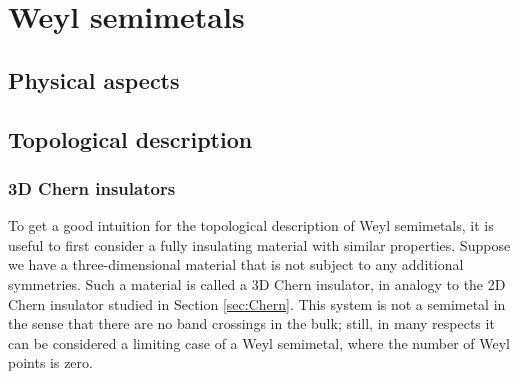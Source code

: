 \chapter{Weyl semimetals}\label{chap:WSM}

\section{Physical aspects}


\section{Topological description}\label{sec:semimetal-topology}


\subsection{3D Chern insulators}

To get a good intuition for the topological description of Weyl semimetals, it is useful to first consider a fully insulating material with similar properties. Suppose we have a three-dimensional material that is not subject to any additional symmetries. Such a material is called a 3D Chern insulator, in analogy to the 2D Chern insulator studied in Section \ref{sec:Chern}.%
This system is not a semimetal in the sense that there are no band crossings in the bulk; still, in many respects it can be considered a limiting case of a Weyl semimetal, where the number of Weyl points is zero. %

